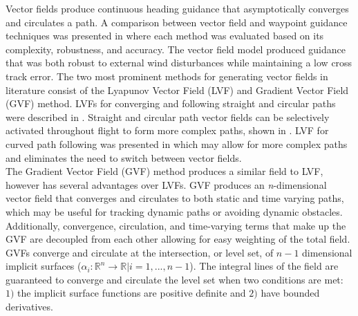 \documentclass[conf]{new-aiaa}
\begin{document}
Vector fields produce continuous heading guidance that asymptotically converges and circulates a path. A comparison between vector field and waypoint guidance techniques was presented in \cite{sujit_unmanned_2014} where each method was evaluated based on its complexity, robustness, and accuracy. The vector field model produced guidance that was both robust to external wind disturbances while maintaining a low cross track error. The two most prominent methods for generating vector fields in literature consist of the Lyapunov Vector Field (LVF) \cite{nelson_cooperative_2005,nelson_vector_2006,nelson_vector_2007,frew_cooperative_2007,miao_orthogonal_2016,griffiths_vector_2006} and Gradient Vector Field (GVF) \cite{goncalves_artificial_2009,goncalves_circulation_2010,goncalves_vector_2010,gerlach_autonomous_2014} method. LVFs for converging and following straight and circular paths were described in \cite{nelson_cooperative_2005}. Straight and circular path vector fields can be selectively activated throughout flight to form more complex paths, shown in \cite{nelson_cooperative_2005,nelson_vector_2006,nelson_vector_2007,jung_unmanned_2016}. LVF for curved path following was presented in \cite{griffiths_vector_2006} which may allow for more complex paths and eliminates the need to switch between vector fields. \\

The Gradient Vector Field (GVF) method produces a similar field to LVF, however has several advantages over LVFs. GVF produces an \textit{n}-dimensional vector field that converges and circulates to both static and time varying paths, which may be useful for tracking dynamic paths or avoiding dynamic obstacles. Additionally, convergence, circulation, and time-varying terms that make up the GVF are decoupled from each other allowing for easy weighting of the total field. GVFs converge and circulate at the intersection, or level set, of $n-1$ dimensional implicit surfaces ($\alpha_i:\mathbb{R}^n\rightarrow\mathbb{R} | i=1,...,n-1$). The integral lines of the field are guaranteed to converge and circulate the level set when two conditions are met: $1)$ the implicit surface functions are positive definite and $2)$ have bounded derivatives. %

\end{document}
